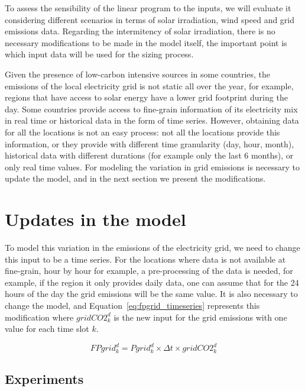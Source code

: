 To assess the sensibility of the linear program to the inputs, we will evaluate it considering different scenarios in terms of solar irradiation, wind speed and grid emissions data. Regarding the intermitency of solar irradiation, there is no necessary modifications to be made in the model itself, the important point is which input data will be used for the sizing process.

Given the presence of low-carbon intensive sources in some countries, the emissions of the local electricity grid is not static all over the year, for example, regions that have access to solar energy have a lower grid footprint during the day. Some countries provide access to fine-grain information of its electricity mix in real time or historical data in the form of time series. However, obtaining data for all the locations is not an easy process: not all the locations provide this information, or they provide with different time granularity (day, hour, month), historical data with different durations (for example only the last 6 months), or only real time values. For modeling the variation in grid emissions is necessary to update the model, and in the next section we present the modifications.

\section{Updates in the model}

To model this variation in the emissions of the electricity grid, we need to change this input to be a time series. For the locations where data is not available at fine-grain, hour by hour for example, a pre-processing of the data is needed, for example, if the region it only provides daily data, one can assume that for the 24 hours of the day the grid emissions  will be the same value. It is also necessary to change the model, and Equation~\eqref{eq:fpgrid_timeseries} represents this modification where $gridCO2^d_k$ is the new input for the grid emissions with one value for each time slot $k$.


\begin{equation} \label{eq:fpgrid_timeseries}
FPgrid_k^d = Pgrid_k^d\times \Delta t \times gridCO2^d_k
\end{equation}

\subsection{Experiments}

